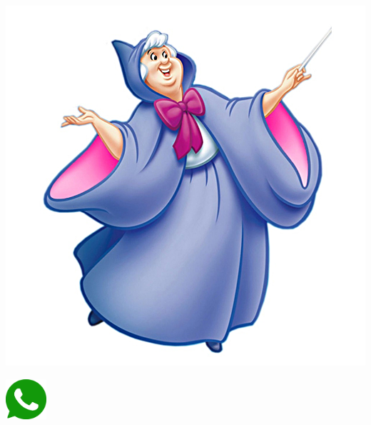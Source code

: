 		
		\begin{multicols}{3}	
			\begin{center}
				\includegraphics[height=.5\textheight]{./IMG-GIT/fada.jpeg}
			\end{center}
			\begin{flushright}
				\includegraphics[height=15mm]{./IMG-GIT/whatsapp.png}
			\end{flushright}
			
			\vfill	
			\columnbreak
			

\end{multicols}
